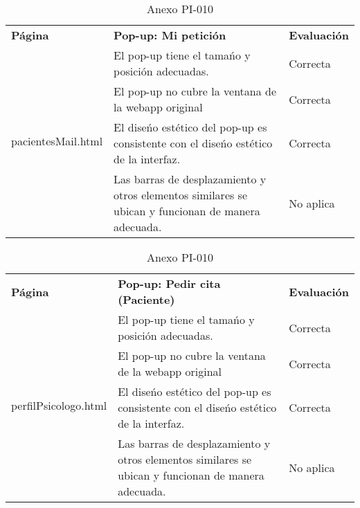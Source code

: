\begin{table}[htpb]
\centering
\begin{tabularx}{\textwidth}{|l|X|l|}
\hline
\rowcolor[gray]{0.9}\multicolumn{3}{|l|}{\textbf{Anexo PI-010}}                                                                                                                     \\ \hline
\textbf{Página}                     & \textbf{Pop-up: Mi petición}                                                                       & \textbf{Evaluación} \\ \hline
\multirow{4}{*}{pacientesMail.html} & El pop-up tiene el tamańo y posición adecuadas.                                                    & Correcta            \\ \cline{2-3} 
                                    & El pop-up no cubre la ventana de la webapp original                                                & Correcta            \\ \cline{2-3} 
                                    & El diseńo estético del pop-up es consistente con el diseńo estético de la interfaz.                & Correcta            \\ \cline{2-3} 
                                    & Las barras de desplazamiento y otros elementos similares se ubican y funcionan de manera adecuada. & No aplica           \\ \hline
\end{tabularx}
\caption{Anexo PI-010}
\end{table}


\begin{table}[htpb]
\centering
\begin{tabularx}{\textwidth}{|l|X|l|}
\hline
\rowcolor[gray]{0.9}\multicolumn{3}{|l|}{\textbf{Anexo PI-010}}                                                                                                                       \\ \hline
\textbf{Página}                       & \textbf{Pop-up: Pedir cita (Paciente)}                                                             & \textbf{Evaluación} \\ \hline
\multirow{4}{*}{perfilPsicologo.html} & El pop-up tiene el tamańo y posición adecuadas.                                                    & Correcta            \\ \cline{2-3} 
                                      & El pop-up no cubre la ventana de la webapp original                                                & Correcta            \\ \cline{2-3} 
                                      & El diseńo estético del pop-up es consistente con el diseńo estético de la interfaz.                & Correcta            \\ \cline{2-3} 
                                      & Las barras de desplazamiento y otros elementos similares se ubican y funcionan de manera adecuada. & No aplica           \\ \hline
\end{tabularx}
\caption{Anexo PI-010}
\end{table}


